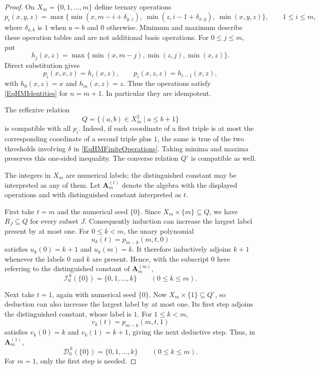 \documentclass[12pt,english]{amsart}
\theoremstyle{definition}
\numberwithin{equation}{section}
\theoremstyle{remark}
\begin{document}
\begin{proof}
On $X_m=\{0,1,\ldots,m\}$ define ternary operations
\begin{equation}\label{EqHMFiniteOperations}
p_i(x,y,z)=\max\bigl\{
\min(x,m-i+\delta_{y,z}),\
\min(z,i-1+\delta_{x,y}),\
\min(x,y,z)\bigr\},\qquad 1\leqslant i\leqslant m,
\end{equation}
where $\delta_{a,b}$ is $1$ when $a=b$ and $0$ otherwise. Minimum
and maximum describe these operation tables and are not additional
basic operations. For $0\leqslant j\leqslant m$, put
\[
h_j(x,z)=\max\{\min(x,m-j),\min(z,j),\min(x,z)\}.
\]
Direct substitution gives
\[
p_i(x,x,z)=h_i(x,z),\qquad p_i(x,z,z)=h_{i-1}(x,z),
\]
with $h_0(x,z)=x$ and $h_m(x,z)=z$. Thus the operations satisfy
\eqref{EqHMIdentities} for $n=m+1$. In particular they are idempotent.

The reflexive relation
\[
Q=\{(a,b)\in X_m^2\mid a\leqslant b+1\}
\]
is compatible with all $p_i$. Indeed, if each coordinate of a first
triple is at most the corresponding coordinate of a second triple
plus $1$, the same is true of the two thresholds involving $\delta$
in \eqref{EqHMFiniteOperations}. Taking minima and maxima preserves
this one-sided inequality. The converse relation $Q^\circ$ is
compatible as well.

The integers in $X_m$ are numerical labels; the distinguished constant
may be interpreted as any of them. Let $\mathbf A_m^{(t)}$ denote the
algebra with the displayed operations and with distinguished constant
interpreted as $t$.

First take $t=m$ and the numerical seed $\{0\}$. Since
$X_m\times\{m\}\subseteq Q$, we have $R_J\subseteq Q$ for every
subset $J$. Consequently induction can increase the largest label
present by at most one. For $0\leqslant k<m$, the unary polynomial
\[
u_k(t)=p_{m-k}(m,t,0)
\]
satisfies $u_k(0)=k+1$ and $u_k(m)=k$. It therefore inductively
adjoins $k+1$ whenever the labels $0$ and $k$ are present. Hence,
with the subscript $0$ here referring to the distinguished constant
of $\mathbf A_m^{(m)}$,
\begin{equation}\label{EqHMInductionChain}
\mathcal I_0^{\,k}(\{0\})=\{0,1,\ldots,k\}
\qquad(0\leqslant k\leqslant m).
\end{equation}

Next take $t=1$, again with numerical seed $\{0\}$. Now
$X_m\times\{1\}\subseteq Q^\circ$, so deduction can also increase
the largest label by at most one. Its first step adjoins the
distinguished constant, whose label is $1$. For $1\leqslant k<m$,
\[
v_k(t)=p_{m-k}(m,t,1)
\]
satisfies $v_k(0)=k$ and $v_k(1)=k+1$, giving the next deductive
step. Thus, in $\mathbf A_m^{(1)}$,
\begin{equation}\label{EqHMDeductionChain}
\mathcal D_0^{\,k}(\{0\})=\{0,1,\ldots,k\}
\qquad(0\leqslant k\leqslant m).
\end{equation}
For $m=1$, only the first step is needed.


\end{proof}
\end{document}
